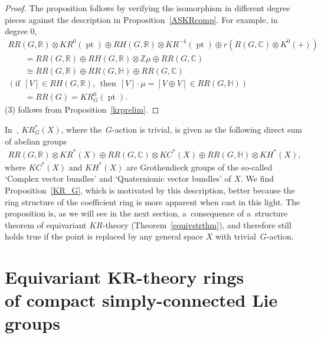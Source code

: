 \documentclass[pdftex]{sigma}
\numberwithin{equation}{section}
\DeclareMathOperator{\pt}{pt}
\begin{document}
\begin{proof}
The proposition
follows by verifying the isomorphism in dif\/ferent degree pieces against the description in
Proposition~\ref{ASKRcomp}.
For example, in degree 0,
\begin{gather*}
RR(G, \mathbb{R})\otimes KR^0(\pt)\oplus RH(G, \mathbb{R})\otimes KR^{-4}(\pt)\oplus r(R(G,
\mathbb{C})\otimes K^0(+))
\\
\qquad=RR(G, \mathbb{R})\oplus RH(G, \mathbb{R})\otimes \mathbb{Z}\mu\oplus RR(G, \mathbb{C})
\\
\qquad
\cong RR(G, \mathbb{R})\oplus RR(G, \mathbb{H})\oplus RR(G, \mathbb{C})
\\
(\text{if} \ \ [V]\in RH(G, \mathbb{R}),\ \ \text{then} \ \ [V]\cdot\mu=[V\oplus V]\in RR(G, \mathbb{H}))
\\
\qquad=RR(G)
=KR^0_G(\pt).
\end{gather*}
(3) follows from Proposition~\ref{krprelim}.
\end{proof}
\begin{Remark}
In~\cite{AS}, $KR_G^*(X)$, where the~$G$-action is trivial, is given as the following direct sum of abelian groups
\begin{gather*}
RR(G, \mathbb{R})\otimes KR^*(X)\oplus RR(G, \mathbb{C})\otimes KC^*(X)\oplus RR(G, \mathbb{H})\otimes KH^*(X),
\end{gather*}
where $KC^*(X)$ and $KH^*(X)$ are Grothendieck groups of the so-called `Complex vector bundles' and `Quaternionic vector
bundles' of $X$.
We f\/ind Proposition~\ref{KR_G}, which is motivated by this description, better because the ring structure of the
coef\/f\/icient ring is more apparent when cast in this light.
The proposition
is, as we will see in the next section, a~consequence of a~structure theorem of equivariant $KR$-theory
(Theorem~\ref{equivstrthm}), and therefore still holds true if the point is replaced by any general space $X$ with
trivial~$G$-action.
\end{Remark}

\section[Equivariant $KR$-theory rings of compact simply-connected Lie groups]{Equivariant
$\boldsymbol{KR}$-theory rings \\ of compact simply-connected Lie groups}\label{Section4}
\end{document}
